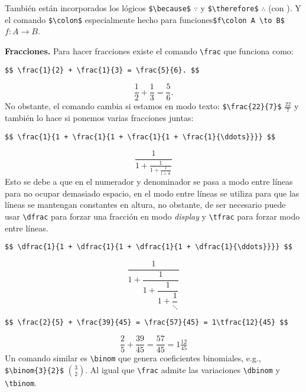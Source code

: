 \documentclass[intro-breve-latex.tex]{subfiles}
\begin{document}
También están incorporados los lógicos \lstinline|$\because$| $\because$ y \lstinline|$\therefore$| $\therefore$ (con
\AmS{}). Y el comando \lstinline|$\colon$| especialmente hecho para funciones\break \lstinline|$f\colon A \to B$| $f\colon A \to B$.

\textbf{Fracciones.}
Para hacer fracciones existe el comando \lstinline|\frac| que funciona como:
\begin{lstlisting}
$$ \frac{1}{2} + \frac{1}{3} = \frac{5}{6}. $$
\end{lstlisting}
$$ \frac{1}{2} + \frac{1}{3} = \frac{5}{6}. $$
No obstante, el comando cambia si estamos en modo texto: \lstinline|$\frac{22}{7}$| $\frac{22}{7}$ y también lo hace si ponemos varias fracciones juntas:
\begin{lstlisting}[basicstyle=\scriptsize\ttfamily]
$$ \frac{1}{1 + \frac{1}{1 + \frac{1}{1 + \frac{1}{\ddots}}}} $$
\end{lstlisting}
$$ \frac{1}{1 + \frac{1}{1 + \frac{1}{1 + \frac{1}{\ddots}}}} $$
Esto se debe a que en el numerador y denominador se pasa a modo entre líneas para no ocupar demasiado espacio, en el modo entre líneas se utiliza para que las líneas se mantengan constantes en altura, no obstante, de ser necesario puede usar \lstinline|\dfrac| para forzar una fracción en modo \textit{display} y \lstinline|\tfrac| para forzar modo entre líneas.
\begin{lstlisting}[basicstyle=\scriptsize\ttfamily]
$$ \dfrac{1}{1 + \dfrac{1}{1 + \dfrac{1}{1 + \dfrac{1}{\ddots}}}} $$
\end{lstlisting}
$$ \dfrac{1}{1 + \dfrac{1}{1 + \dfrac{1}{1 + \dfrac{1}{\ddots}}}} $$
\begin{lstlisting}[basicstyle=\scriptsize\ttfamily]
$$ \frac{2}{5} + \frac{39}{45} = \frac{57}{45} = 1\tfrac{12}{45} $$
\end{lstlisting}
$$ \frac{2}{5} + \frac{39}{45} = \frac{57}{45} = 1\tfrac{12}{45} $$
Un comando similar es \lstinline|\binom| que genera coeficientes binomiales, e.g.,\break
\lstinline|$\binom{3}{2}$| $\binom{3}{2}$.
Al igual que \lstinline|\frac| admite las variaciones \lstinline|\dbinom| y \lstinline|\tbinom|.

\end{document}
